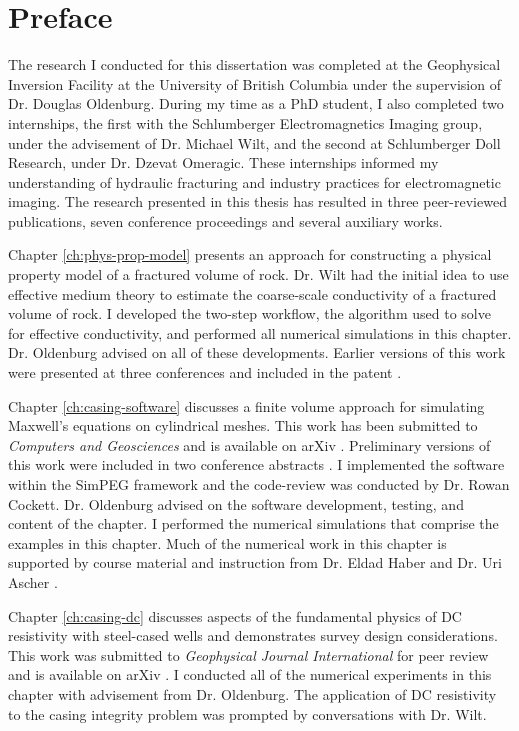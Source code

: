 
\chapter{Preface}

The research I conducted for this dissertation was completed at the Geophysical Inversion Facility at the University of British Columbia under the supervision of Dr. Douglas Oldenburg. During my time as a PhD student, I also completed two internships, the first with the Schlumberger Electromagnetics Imaging group, under the advisement of Dr. Michael Wilt, and the second at Schlumberger Doll Research, under Dr. Dzevat Omeragic. These internships informed my understanding of hydraulic fracturing and industry practices for electromagnetic imaging. The research presented in this thesis has resulted in three peer-reviewed publications, seven conference proceedings and several auxiliary works.

Chapter \ref{ch:phys-prop-model} presents an approach for constructing a physical property
model of a fractured volume of rock. Dr. Wilt had the initial idea to use effective medium theory to estimate the coarse-scale conductivity of a fractured volume of rock. I developed the two-step workflow, the algorithm used to solve for effective conductivity, and performed all numerical simulations in this chapter. Dr. Oldenburg advised on all of these developments. Earlier versions of this work were presented at three conferences \citep{Heagy2013, Heagy2014, Wilt2014} and included in the patent \cite{Wilt2015}.

Chapter \ref{ch:casing-software} discusses a finite volume approach for simulating Maxwell’s equations on cylindrical meshes. This work has been submitted to \emph{Computers and Geosciences} and is available on arXiv \citep{Heagy2018a}. Preliminary versions of this work were included in two conference abstracts \citep{Heagy2015, Heagy2017a}. I implemented the software within the SimPEG framework and the code-review was conducted by Dr. Rowan Cockett. Dr. Oldenburg advised on the software development, testing, and content of the chapter. I performed the numerical simulations that comprise the examples in this chapter. Much of the numerical work in this chapter is supported by course material and instruction from Dr. Eldad Haber and Dr. Uri Ascher \citep{Haber2014a, Ascher2008}.

Chapter \ref{ch:casing-dc} discusses aspects of the fundamental physics of DC resistivity with steel-cased wells and demonstrates survey design considerations. This work was submitted to \emph{Geophysical Journal International} for peer review and is available on arXiv \citep{Heagy2018c}. I conducted all of the numerical experiments in this chapter with advisement from Dr. Oldenburg. The application of DC resistivity to the casing integrity problem was prompted by conversations with Dr. Wilt.

